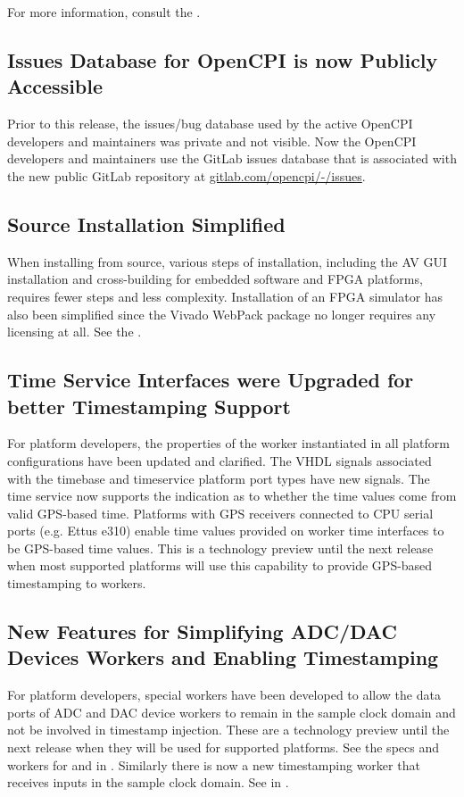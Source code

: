 For more information, consult the .

\subsection{Issues Database for OpenCPI is now Publicly Accessible}
\label{sec:16_issues}
Prior to this release, the issues/bug database used by the active OpenCPI developers and maintainers was private and not visible.  Now the OpenCPI developers and maintainers use the GitLab issues database that is associated with the new public GitLab repository at \url{gitlab.com/opencpi/-/issues}.

\subsection{Source Installation Simplified}
\label{sec:16_install}
When installing from source,  various steps of installation, including the AV GUI installation and cross-building for embedded software and FPGA platforms, requires fewer steps and less complexity. Installation of an FPGA simulator has also been simplified since the Vivado WebPack package no longer requires any licensing at all.  See the .

\subsection{Time Service Interfaces were Upgraded for better Timestamping Support}
\label{sec:16_time}
For platform developers, the properties of the  worker instantiated in all platform configurations have been updated and clarified.  The VHDL signals associated with the timebase and timeservice platform port types have new signals.  The time service now supports the indication as to whether the time values come from valid GPS-based time.  Platforms with GPS receivers connected to CPU serial ports (e.g. Ettus e310) enable time values provided on worker time interfaces to be GPS-based time values.  This is a technology preview until the next release when most supported platforms will use this capability to provide GPS-based timestamping to workers.

\subsection{New Features for Simplifying ADC/DAC Devices Workers and Enabling Timestamping}
\label{sec:16_adcdac}
For platform developers, special workers have been developed to allow the data ports of ADC and DAC device workers to remain in the sample clock domain and not be involved in timestamp injection.  These are a technology preview
until the next release when they will be used for supported platforms.  See the specs and workers for  and  in .  Similarly there is now a new timestamping worker that receives inputs in the sample clock domain.  See  in .

